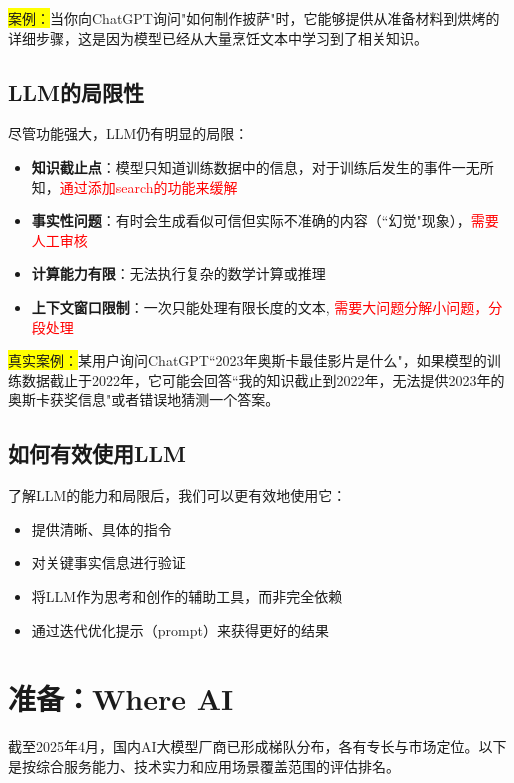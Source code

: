 \documentclass{article}
\begin{document}
\colorbox{yellow}{案例：}当你向ChatGPT询问"如何制作披萨"时，它能够提供从准备材料到烘烤的详细步骤，这是因为模型已经从大量烹饪文本中学习到了相关知识。

\subsection{LLM的局限性}
尽管功能强大，LLM仍有明显的局限：

\begin{itemize}
  \item \textbf{知识截止点}：模型只知道训练数据中的信息，对于训练后发生的事件一无所知，\textcolor{red}{通过添加search的功能来缓解}
  \item \textbf{事实性问题}：有时会生成看似可信但实际不准确的内容（``幻觉"现象），\textcolor{red}{需要人工审核}
  \item \textbf{计算能力有限}：无法执行复杂的数学计算或推理
  \item \textbf{上下文窗口限制}：一次只能处理有限长度的文本, \textcolor{red}{需要大问题分解小问题，分段处理}
\end{itemize}

\colorbox{yellow}{真实案例：}某用户询问ChatGPT``2023年奥斯卡最佳影片是什么"，如果模型的训练数据截止于2022年，它可能会回答``我的知识截止到2022年，无法提供2023年的奥斯卡获奖信息"或者错误地猜测一个答案。

\subsection{如何有效使用LLM}
了解LLM的能力和局限后，我们可以更有效地使用它：

\begin{itemize}
  \item 提供清晰、具体的指令
  \item 对关键事实信息进行验证
  \item 将LLM作为思考和创作的辅助工具，而非完全依赖
  \item 通过迭代优化提示（prompt）来获得更好的结果
\end{itemize}

\begin{center}
  {\LARGE  {}}
\end{center}

\newpage

\section{准备：Where AI}
截至2025年4月，国内AI大模型厂商已形成梯队分布，各有专长与市场定位。以下是按综合服务能力、技术实力和应用场景覆盖范围的评估排名。
\end{document}
